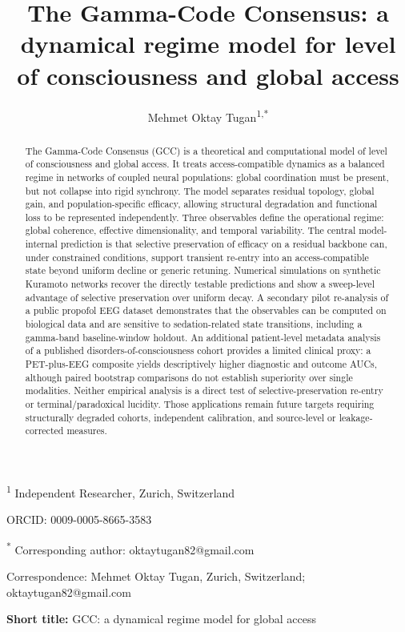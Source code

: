 ﻿\documentclass[11pt,a4paper]{article}
\title{%
  \textbf{The Gamma-Code Consensus: a dynamical regime model for level of consciousness and global access}
}
\author{%
  Mehmet Oktay Tugan\textsuperscript{1,*}
}
\date{}
\theoremstyle{plain}
\theoremstyle{definition}
\theoremstyle{remark}
\begin{document}
\maketitle
\thispagestyle{fancy}

\noindent
\textsuperscript{1} Independent Researcher, Zurich, Switzerland

\noindent
ORCID: 0009-0005-8665-3583

\noindent
\textsuperscript{*} Corresponding author: oktaytugan82@gmail.com

\noindent
Correspondence: Mehmet Oktay Tugan, Zurich, Switzerland; oktaytugan82@gmail.com

\medskip
\noindent
\textbf{Short title:} GCC: a dynamical regime model for global access

\bigskip

\begin{abstract}
\noindent
The Gamma-Code Consensus (GCC) is a theoretical and computational model of level of consciousness and global access. It treats access-compatible dynamics as a balanced regime in networks of coupled neural populations: global coordination must be present, but not collapse into rigid synchrony. The model separates residual topology, global gain, and population-specific efficacy, allowing structural degradation and functional loss to be represented independently. Three observables define the operational regime: global coherence, effective dimensionality, and temporal variability. The central model-internal prediction is that selective preservation of efficacy on a residual backbone can, under constrained conditions, support transient re-entry into an access-compatible state beyond uniform decline or generic retuning. Numerical simulations on synthetic Kuramoto networks recover the directly testable predictions and show a sweep-level advantage of selective preservation over uniform decay. A secondary pilot re-analysis of a public propofol EEG dataset demonstrates that the observables can be computed on biological data and are sensitive to sedation-related state transitions, including a gamma-band baseline-window holdout. An additional patient-level metadata analysis of a published disorders-of-consciousness cohort provides a limited clinical proxy: a PET-plus-EEG composite yields descriptively higher diagnostic and outcome AUCs, although paired bootstrap comparisons do not establish superiority over single modalities. Neither empirical analysis is a direct test of selective-preservation re-entry or terminal/paradoxical lucidity. Those applications remain future targets requiring structurally degraded cohorts, independent calibration, and source-level or leakage-corrected measures.
\end{abstract}
\end{document}
